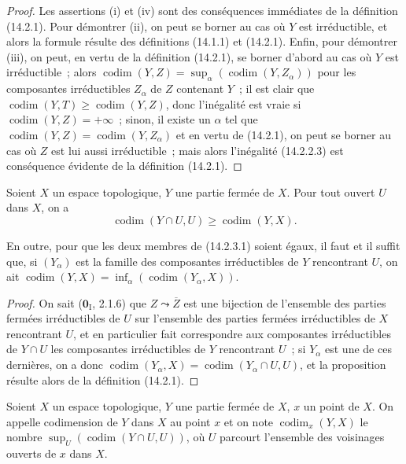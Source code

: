 \begin{proof}
Les assertions (i) et (iv) sont des conséquences immédiates de la définition
(14.2.1). Pour démontrer (ii), on peut se borner au cas où $Y$ est
irréductible, et alors la formule résulte des définitions (14.1.1) et
(14.2.1). Enfin, pour démontrer (iii), on peut, en vertu de la définition
(14.2.1), se borner d'abord au cas où $Y$ est irréductible~; alors
$\operatorname{codim}(Y,Z)=
\sup_\alpha(\operatorname{codim}(Y,Z_\alpha))$ pour les composantes
irréductibles $Z_\alpha$ de $Z$ contenant $Y$~; il est clair que
$\operatorname{codim}(Y,T)\geq\operatorname{codim}(Y,Z)$, donc l'inégalité
est vraie si $\operatorname{codim}(Y,Z)=+\infty$~; sinon, il existe un
$\alpha$ tel que
$\operatorname{codim}(Y,Z)=\operatorname{codim}(Y,Z_\alpha)$ et en vertu de
(14.2.1), on peut se borner au cas où $Z$ est lui aussi irréductible~; mais
alors l'inégalité (14.2.2.3) est conséquence évidente de la définition
(14.2.1).
\end{proof}

\begin{proposition}[14.2.3]
\label{0.14.2.3-fr}
Soient $X$ un espace topologique, $Y$ une partie fermée de $X$. Pour tout
ouvert $U$ dans $X$, on a
\[
  \operatorname{codim}(Y\cap U,U)\geq\operatorname{codim}(Y,X).
  \tag{14.2.3.1}\label{0.14.2.3.1-fr}
\]

En outre, pour que les deux membres de \textup{(14.2.3.1)} soient égaux, il faut et il
suffit que, si $(Y_\alpha)$ est la famille des composantes irréductibles de
$Y$ rencontrant $U$, on ait
$\operatorname{codim}(Y,X)=
\inf_\alpha(\operatorname{codim}(Y_\alpha,X))$.
\end{proposition}

\begin{proof}
On sait ($\mathbf{0}_{\mathrm I}$, 2.1.6) que $Z\leadsto\overline Z$ est une bijection
de l'ensemble des parties fermées irréductibles de $U$ sur l'ensemble des
parties fermées irréductibles de $X$ rencontrant $U$, et en particulier fait
correspondre aux composantes irréductibles de $Y\cap U$ les composantes
irréductibles de $Y$ rencontrant $U$~; si $Y_\alpha$ est une de ces
dernières, on a donc
$\operatorname{codim}(Y_\alpha,X)=
\operatorname{codim}(Y_\alpha\cap U,U)$, et la proposition résulte alors de
la définition (14.2.1).
\end{proof}

\begin{definition}[14.2.4]
\label{0.14.2.4-fr}
Soient $X$ un espace topologique, $Y$ une partie fermée de $X$, $x$ un point
de $X$. On appelle codimension de $Y$ dans $X$ au point $x$ et on note
$\operatorname{codim}_x(Y,X)$ le nombre
$\sup_U(\operatorname{codim}(Y\cap U,U))$, où $U$ parcourt l'ensemble des
voisinages ouverts de $x$ dans $X$.
\end{definition}

